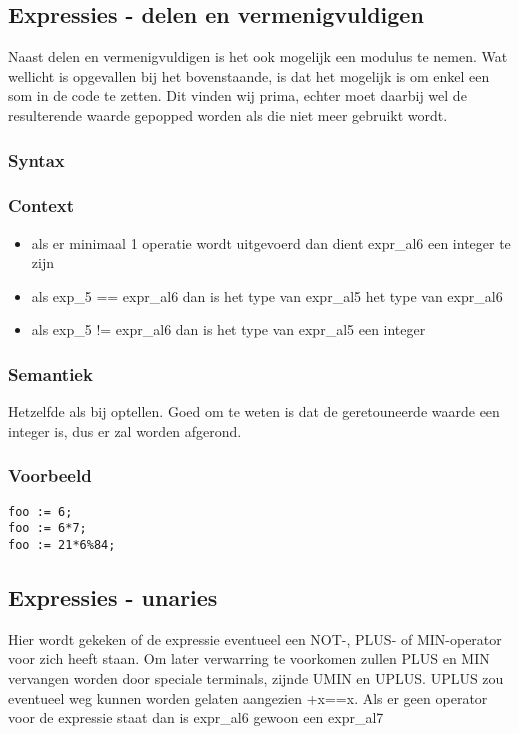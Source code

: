\documentclass[]{article}
\begin{document}
\subsection{Expressies - delen en vermenigvuldigen}
Naast delen en vermenigvuldigen is het ook mogelijk een modulus te nemen.
Wat wellicht is opgevallen bij het bovenstaande, is dat het mogelijk is om enkel een som in de code te zetten. Dit vinden wij prima, echter moet daarbij wel de resulterende waarde gepopped worden als die niet meer gebruikt wordt.
\subsubsection{Syntax}

\subsubsection{Context}
\begin{itemize}
\item als er minimaal 1 operatie wordt uitgevoerd dan dient expr\_al6 een integer te zijn
\item als exp\_5 == expr\_al6 dan is het type van expr\_al5 het type van expr\_al6
\item als exp\_5 != expr\_al6 dan is het type van expr\_al5 een integer
\end{itemize}
\subsubsection{Semantiek}
Hetzelfde als bij optellen. Goed om te weten is dat de geretouneerde waarde een integer is, dus er zal worden afgerond.
\subsubsection{Voorbeeld}
\begin{lstlisting}[style=SELMA]
foo := 6;
foo := 6*7;
foo := 21*6%84;
\end{lstlisting}


\subsection{Expressies - unaries}
Hier wordt gekeken of de expressie eventueel een NOT-, PLUS- of MIN-operator voor zich heeft staan.
Om later verwarring te voorkomen zullen PLUS en MIN vervangen worden door speciale terminals, zijnde UMIN en UPLUS. UPLUS zou eventueel weg kunnen worden gelaten aangezien +x==x.
Als er geen operator voor de expressie staat dan is expr\_al6 gewoon een expr\_al7
\end{document}
